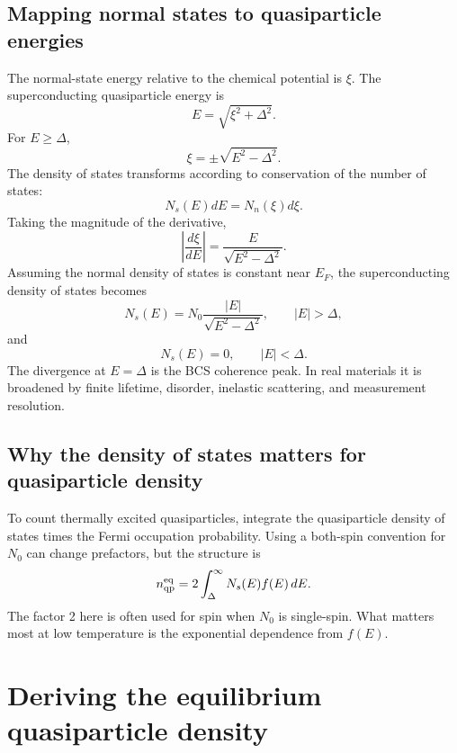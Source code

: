 \documentclass[11pt]{article}
\newcommand{\eq}{\mathrm{eq}}
\begin{document}
\subsection{Mapping normal states to quasiparticle energies}
The normal-state energy relative to the chemical potential is $\xi$. The superconducting quasiparticle energy is
\begin{equation}
E=\sqrt{\xi^2+\Delta^2}.
\end{equation}
For $E\ge\Delta$,
\begin{equation}
\xi=\pm\sqrt{E^2-\Delta^2}.
\end{equation}
The density of states transforms according to conservation of the number of states:
\begin{equation}
N_s(E)dE=N_n(\xi)d\xi.
\end{equation}
Taking the magnitude of the derivative,
\begin{equation}
\left|\frac{d\xi}{dE}\right|=\frac{E}{\sqrt{E^2-\Delta^2}}.
\end{equation}
Assuming the normal density of states is constant near $E_F$, the superconducting density of states becomes
\begin{equation}
N_s(E)=N_0\frac{|E|}{\sqrt{E^2-\Delta^2}},\qquad |E|>\Delta,
\end{equation}
and
\begin{equation}
N_s(E)=0,\qquad |E|<\Delta.
\end{equation}
The divergence at $E=\Delta$ is the BCS coherence peak. In real materials it is broadened by finite lifetime, disorder, inelastic scattering, and measurement resolution.

\subsection{Why the density of states matters for quasiparticle density}
To count thermally excited quasiparticles, integrate the quasiparticle density of states times the Fermi occupation probability. Using a both-spin convention for $N_0$ can change prefactors, but the structure is
\begin{equation}
 n_{\qp}^{\eq}=2\int_{\Delta}^{\infty}N_s(E)f(E)\,dE.
\end{equation}
The factor 2 here is often used for spin when $N_0$ is single-spin. What matters most at low temperature is the exponential dependence from $f(E)$.

\section{Deriving the equilibrium quasiparticle density}
\end{document}
